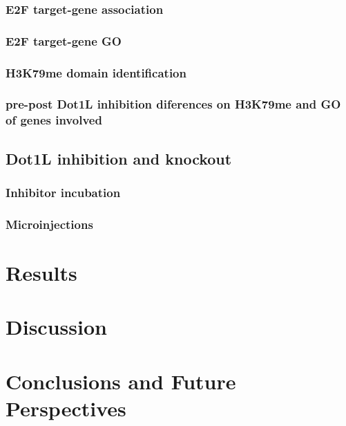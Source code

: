 \documentclass[11pt,twoside,a4paper]{report}
\begin{document}
		\subsection{E2F target-gene association}
		\subsection{E2F target-gene GO}
		\subsection{H3K79me domain identification}
		\subsection{pre-post Dot1L inhibition diferences on H3K79me and GO of genes involved}

	\section{Dot1L inhibition and knockout}
		\subsection{Inhibitor incubation}
		\subsection{Microinjections}


\clearpage


\chapter{Results}



\clearpage

\chapter{Discussion}


\clearpage

\chapter{Conclusions and Future Perspectives}
\end{document}
